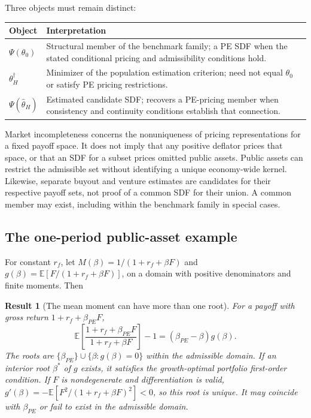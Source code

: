 \documentclass[11pt]{article}
\newcommand{\E}{\mathbb{E}}
\theoremstyle{plain}
\newtheorem{result}{Result}[section]
\theoremstyle{definition}
\begin{document}
Three objects must remain distinct:
\begin{center}
\small
\begin{tabular}{@{}L{3.0cm}L{12.4cm}@{}}
\toprule
Object & Interpretation\\
\midrule
$\Psi(\theta_0)$ & Structural member of the benchmark family; a PE SDF when the stated conditional pricing and admissibility conditions hold.\\
$\theta_H^\dagger$ & Minimizer of the population estimation criterion; need not equal $\theta_0$ or satisfy PE pricing restrictions.\\
$\Psi(\hat\theta_H)$ & Estimated candidate SDF; recovers a PE-pricing member when consistency and continuity conditions establish that connection.\\
\bottomrule
\end{tabular}
\end{center}

Market incompleteness concerns the nonuniqueness of pricing representations for a fixed payoff space. It does not imply that any positive deflator prices that space, or that an SDF for a subset prices omitted public assets. Public assets can restrict the admissible set without identifying a unique economy-wide kernel. Likewise, separate buyout and venture estimates are candidates for their respective payoff sets, not proof of a common SDF for their union. A common member may exist, including within the benchmark family in special cases.

\subsection{The one-period public-asset example}

For constant $r_f$, let $M(\beta)=1/(1+r_f+\beta F)$ and $g(\beta)=\E[F/(1+r_f+\beta F)]$, on a domain with positive denominators and finite moments. Then
\begin{result}[The mean moment can have more than one root]
\label{res:roots}
For a payoff with gross return $1+r_f+\beta_{PE}F$,
\begin{equation}
\label{eq:roots}
\E\left[\frac{1+r_f+\beta_{PE}F}{1+r_f+\beta F}\right]-1
=(\beta_{PE}-\beta)g(\beta).
\end{equation}
The roots are $\{\beta_{PE}\}\cup\{\beta:g(\beta)=0\}$ within the admissible domain. If an interior root $\beta^\ast$ of $g$ exists, it satisfies the growth-optimal portfolio first-order condition. If $F$ is nondegenerate and differentiation is valid, $g'(\beta)=-\E[F^2/(1+r_f+\beta F)^2]<0$, so this root is unique. It may coincide with $\beta_{PE}$ or fail to exist in the admissible domain.
\end{result}
\end{document}
